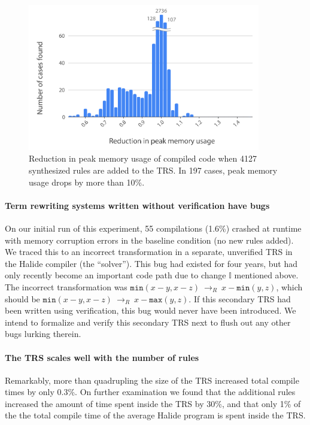 \documentclass[acmsmall,review,anonymous]{acmart}\settopmatter{printfolios=true,printccs=false,printacmref=false}
\newcommand{\hmax}[0]{\texttt{max}}
\newcommand{\hmin}[0]{\texttt{min}}
\newcommand{\rewrites}[0]{\:\rightarrow_{R}\:}
\begin{document}
\begin{figure}
  \includegraphics[width=4in]{figures/memoryhistogram.pdf}
\caption{Reduction in peak memory usage of compiled code when 4127
  synthesized rules are added to the TRS. In 197 cases, peak memory usage
  drops by more than 10\%.}
\label{fig:peakmemoryhistogram}
\end{figure}

\paragraph{Term rewriting systems written without verification have bugs}
On our initial run of this experiment, 55 compilations (1.6\%) crashed
at runtime with memory corruption errors in the baseline condition (no
new rules added). We traced this to an incorrect transformation in a
separate, unverified TRS in the Halide compiler (the ``solver''). This
bug had existed for four years, but had only recently become an
important code path due to change $\mathbb{I}$ mentioned above. The
incorrect transformation was $\hmin(x - y, x - z) \rewrites x - \hmin(y, z)$,
which should be $\hmin(x - y, x - z) \rewrites x - \hmax(y, z)$. If this
secondary TRS had been written using verification, this bug would
never have been introduced. We intend to formalize and verify this
secondary TRS next to flush out any other bugs lurking therein.

\paragraph{The TRS scales well with the number of rules}
Remarkably, more than quadrupling the size of the TRS increased total compile
times by only 0.3\%. On further examination we found that the
additional rules increased the amount of time spent inside the TRS by
30\%, and that only 1\% of the the total compile time of the average
Halide program is spent inside the TRS.
\end{document}
